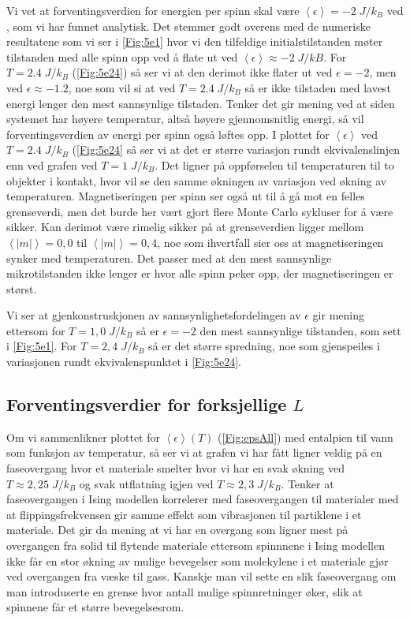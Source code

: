 \documentclass[reprint,english,notitlepage]{revtex4-2}  %
\begin{document}
Vi vet at forventingsverdien for energien per spinn skal være $\left < \epsilon \right > = -2 \; J/k_B$ ved , som vi har funnet analytisk. Det stemmer godt overens med de numeriske resultatene som vi ser i \autoref{Fig:5e1} hvor vi den tilfeldige initialstilstanden møter tilstanden med alle spinn opp ved å flate ut ved $\left < \epsilon \right > \approx -2 \; J/kB$. For $T = 2.4 \; J/k_B$ (\autoref{Fig:5e24}) så ser vi at den derimot ikke flater ut ved $ \epsilon = -2$, men ved $\epsilon \approx -1.2 $, noe som vil si at ved $T = 2.4 \; J/k_B$ så er ikke tilstaden med lavest energi lenger den mest sannsynlige tilstaden. Tenker det gir mening ved at siden systemet har høyere temperatur, altså høyere gjennomsnitlig energi, så vil forventingsverdien av energi per spinn også løftes opp. I plottet for $\left < \epsilon \right >$ ved $T = 2.4  \; J/k_B$ (\autoref{Fig:5e24} så ser vi at det er større variasjon rundt ekvivalenslinjen enn ved grafen ved $T = 1 \; J/k_B$. Det ligner på oppførselen til temperaturen til to objekter i kontakt, hvor vil se den samme økningen av variasjon ved økning av temperaturen. Magnetiseringen per spinn ser også ut til å gå mot en felles grenseverdi, men det burde her vært gjort flere Monte Carlo sykluser for å være sikker. Kan derimot være rimelig sikker på at grenseverdien ligger mellom $\left < | m | \right > = 0,0$ til $\left < | m | \right > = 0,4$, noe som ihvertfall sier oss at magnetiseringen synker med temperaturen. Det passer med at den mest sannsynlige mikrotilstanden ikke lenger er hvor alle spinn peker opp, der magnetiseringen er størst.

Vi ser at gjenkonstruskjonen av sannsynlighetsfordelingen av $\epsilon$ gir mening ettersom for $T = 1,0 \; J/k_B$ så er $\epsilon = -2$ den mest sannsynlige tilstanden, som sett i \autoref{Fig:5e1}. For $T = 2,4 \; J/k_B$ så er det større spredning, noe som gjenspeiles i variasjonen rundt ekvivalenspunktet i \autoref{Fig:5e24}.

\subsection*{Forventingsverdier for forksjellige $L$}

Om vi sammenlikner plottet for $\left < \epsilon \right > (T)$ (\autoref{Fig:epsAll}) med entalpien til vann som funksjon av temperatur, så ser vi at grafen vi har fått ligner veldig på en faseovergang hvor et materiale smelter hvor vi har en svak økning ved $T \approx 2,25 \; J/k_B$ og svak utflatning igjen ved $T \approx 2,3 \; J/k_B$. Tenker at faseovergangen i Ising modellen korrelerer med faseovergangen til materialer med at flippingsfrekvensen gir samme effekt som vibrasjonen til partiklene i et materiale. Det gir da mening at vi har en overgang som ligner mest på overgangen fra solid til flytende materiale ettersom spinnnene i Ising modellen ikke får en stor økning av mulige bevegelser som molekylene i et materiale gjør ved overgangen fra væske til gass. Kanskje man vil sette en slik faseovergang om man introduserte en grense hvor antall mulige spinnretninger øker, slik at spinnene får et større bevegelsesrom.
\end{document}
